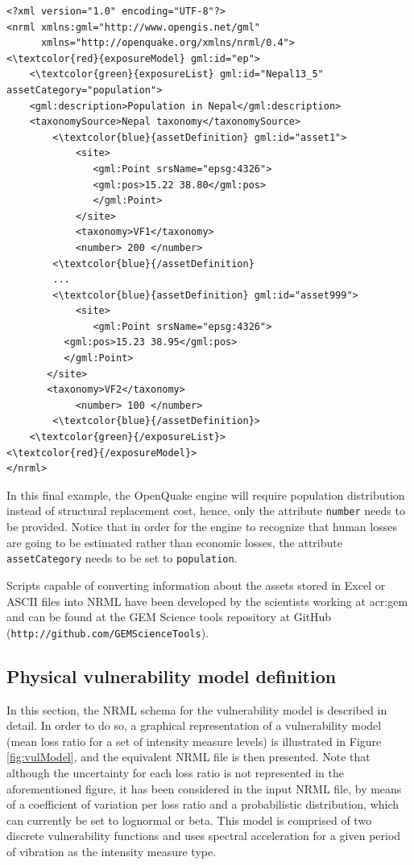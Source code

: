 \begin{Verbatim}[frame=single, commandchars=\\\{\}, samepage=false]
<?xml version="1.0" encoding="UTF-8"?>
<nrml xmlns:gml="http://www.opengis.net/gml"
      xmlns="http://openquake.org/xmlns/nrml/0.4">
<\textcolor{red}{exposureModel} gml:id="ep">
    <\textcolor{green}{exposureList} gml:id="Nepal13_5" assetCategory="population">
    <gml:description>Population in Nepal</gml:description>
    <taxonomySource>Nepal taxonomy</taxonomySource>
        <\textcolor{blue}{assetDefinition} gml:id="asset1">
            <site>
               <gml:Point srsName="epsg:4326">
               <gml:pos>15.22 38.80</gml:pos>
               </gml:Point>
            </site>
            <taxonomy>VF1</taxonomy>
            <number> 200 </number>
        <\textcolor{blue}{/assetDefinition} 
        ...
        <\textcolor{blue}{assetDefinition} gml:id="asset999">
            <site>
               <gml:Point srsName="epsg:4326">
	      <gml:pos>15.23 38.95</gml:pos>
	      </gml:Point>
	   </site>
	   <taxonomy>VF2</taxonomy>
            <number> 100 </number>
        <\textcolor{blue}{/assetDefinition}> 
    <\textcolor{green}{/exposureList}>
<\textcolor{red}{/exposureModel}>
</nrml>
\end{Verbatim}

In this final example, the OpenQuake engine will require population distribution instead of structural replacement cost, hence, only the attribute \Verb+number+ needs to be provided. Notice that in order for the engine to recognize that human losses are going to be estimated rather than economic losses, the attribute \Verb+assetCategory+ needs to be set to  \Verb+population+.  
 
Scripts capable of converting information about the assets stored in Excel or ASCII files into NRML have been developed by the scientists working at \gls{acr:gem} and can be found at the GEM Science tools repository at GitHub (\textcolor{blue01}{\Verb+http://github.com/GEMScienceTools+}). 

\subsection{Physical vulnerability model definition}
In this section, the NRML schema for the \gls{vulnerability model} is described in detail. In order to do so, a graphical representation of a \gls{vulnerability model} (mean loss ratio for a set of intensity measure levels) is illustrated in Figure \ref{fig:vulModel}, and the equivalent NRML file is then presented. Note that although the uncertainty for each loss ratio is not represented in the aforementioned figure, it has been considered in the input NRML file, by means of a coefficient of variation per loss ratio and a probabilistic distribution, which can currently be set to lognormal or beta. This model is comprised of two discrete \glspl{vulnerability function} and uses spectral acceleration for a given period of vibration as the intensity measure type. 


